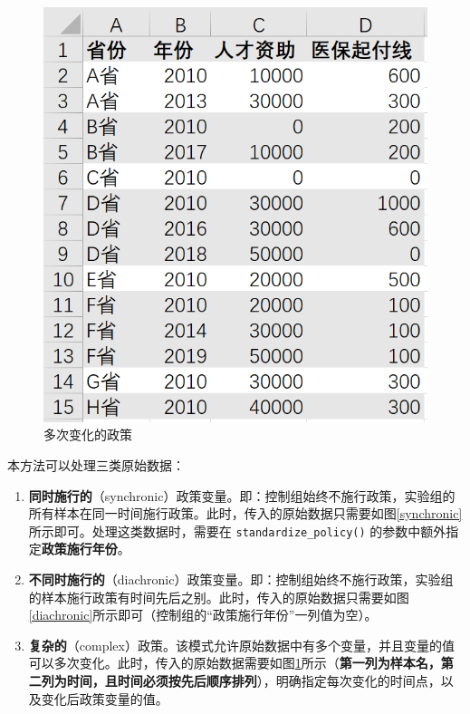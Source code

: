 \documentclass[a4paper, UTF8, fontset=none]{ctexart}
\begin{document}
    \begin{figure}
        \centering
        \includegraphics[height=0.25\textheight]{pics/004.png}
        \caption{多次变化的政策}
        \label{unstable}
    \end{figure}

    本方法可以处理三类原始数据：

    \begin{enumerate}
        \item \textbf{同时施行的}（synchronic）政策变量。即：控制组始终不施行政策，实验组的所有样本在同一时间施行政策。此时，传入的原始数据只需要如图\ref{synchronic}所示即可。处理这类数据时，需要在 \verb|standardize_policy()| 的参数中额外指定\textbf{政策施行年份}。
        \item \textbf{不同时施行的}（diachronic）政策变量。即：控制组始终不施行政策，实验组的样本施行政策有时间先后之别。此时，传入的原始数据只需要如图\ref{diachronic}所示即可（控制组的“政策施行年份”一列值为空）。
        \item \textbf{复杂的}（complex）政策。该模式允许原始数据中有多个变量，并且变量的值可以多次变化。此时，传入的原始数据需要如图\ref{unstable}所示（\textbf{第一列为样本名，第二列为时间，且时间必须按先后顺序排列}），明确指定每次变化的时间点，以及变化后政策变量的值。
    \end{enumerate}
\end{document}
